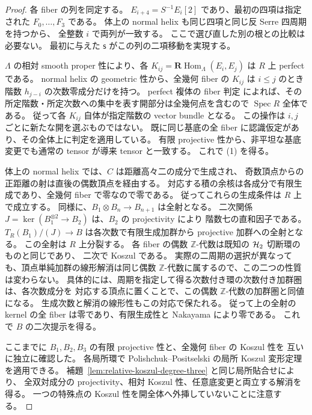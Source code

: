 \begin{proof}
各 fiber の列を同定する。
$E_{i+4}=S^{-1}E_i[2]$ であり、最初の四項は指定された $F_0,\ldots,F_3$ である。
体上の normal helix も同じ四項と同じ反 Serre 四周期を持つから、
全整数 $i$ で両列が一致する。
ここで選び直した別の根との比較は必要ない。
最初に与えた $\mathsf s$ がこの列の二項移動を実現する。

$\Lambda$ の相対 smooth proper 性により、各
$K_{ij}=\mathbf R\operatorname{Hom}_{\Lambda}(E_i,E_j)$ は $R$ 上 perfect である。
normal helix の geometric 性から、全幾何 fiber の $K_{ij}$ は
$i\le j$ のとき階数 $h_{j-i}$ の次数零成分だけを持つ。
perfect 複体の fiber 判定
\cite[Tag 0BDK, Lemma 36.31.3]{StacksPerfectFibers}
によれば、その所定階数・所定次数への集中を表す開部分は全幾何点を含むので
$\operatorname{Spec}R$ 全体である。
従って各 $K_{ij}$ 自体が指定階数の vector bundle となる。
この操作は $i,j$ ごとに新たな開を選ぶものではない。
既に同じ基底の全 fiber に認識仮定があり、その全体上に判定を適用している。
有限 projective 性から、非平坦な基底変更でも通常の tensor が導来 tensor と一致する。
これで (1) を得る。

体上の normal helix では、$C$ は距離高々二の成分で生成され、
奇数頂点からの正距離の射は直後の偶数頂点を経由する。
対応する積の余核は各成分で有限生成であり、全幾何 fiber で零なので零である。
従ってこれらの生成条件は $R$ 上で成立する。
同様に、$B_1\otimes B_n\to B_{n+1}$ は全射となる。
二次関係 $J=\ker(B_1^{\otimes2}\to B_2)$ は、$B_2$ の projectivity により
階数七の直和因子である。
$T_R(B_1)/(J)\to B$ は各次数で有限生成加群から projective 加群への全射となる。
この全射は $R$ 上分裂する。
各 fiber の偶数 $\mathbb Z$-代数は既知の $\mathcal H_2$ 切断環のものと同じであり、
二次で Koszul である。
実際の二周期の選択が異なっても、頂点単純加群の線形解消は同じ偶数
$\mathbb Z$-代数に属するので、この二つの性質は変わらない。
具体的には、周期を指定して得る次数付き環の次数付き加群圏は、各次数成分を
対応する頂点に置くことで、この偶数 $\mathbb Z$-代数の加群圏と同値になる。
生成次数と解消の線形性もこの対応で保たれる。
従って上の全射の kernel の全 fiber は零であり、有限生成性と Nakayama により零である。
これで $B$ の二次提示を得る。

ここまでに $B_1,B_2,B_3$ の有限 projective 性と、全幾何 fiber の Koszul 性を
互いに独立に確認した。
各局所環で Polishchuk--Positselski の局所 Koszul 変形定理
\cite[Chapter 6, Theorem 7.3]{PolishchukPositselski2005} を適用できる。
補題~\ref{lem:relative-koszul-degree-three} と同じ局所貼合せにより、
全双対成分の projectivity、相対 Koszul 性、任意底変更と両立する解消を得る。
一つの特殊点の Koszul 性を開全体へ外挿していないことに注意する。


\end{proof}

